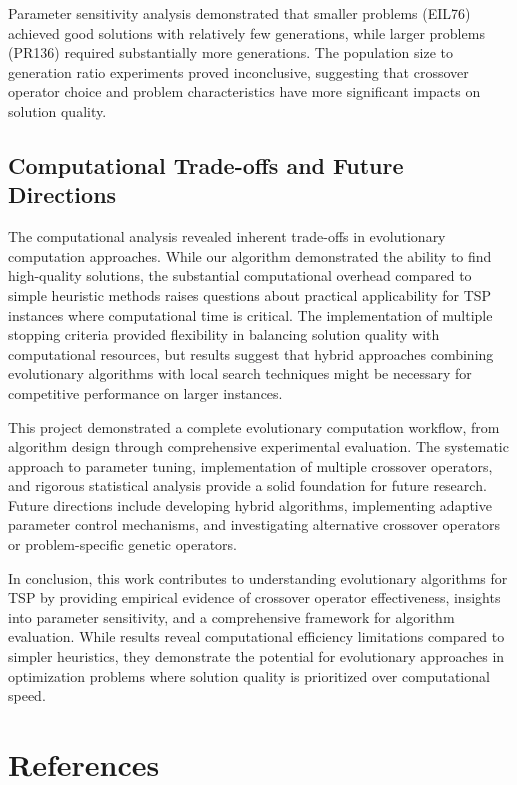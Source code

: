 \documentclass{scrartcl}
\begin{document}
Parameter sensitivity analysis demonstrated that smaller problems (EIL76) achieved good solutions with relatively few generations, while larger problems (PR136) required substantially more generations. The population size to generation ratio experiments proved inconclusive, suggesting that crossover operator choice and problem characteristics have more significant impacts on solution quality.

\subsection{Computational Trade-offs and Future Directions}

The computational analysis revealed inherent trade-offs in evolutionary computation approaches. While our algorithm demonstrated the ability to find high-quality solutions, the substantial computational overhead compared to simple heuristic methods raises questions about practical applicability for TSP instances where computational time is critical. The implementation of multiple stopping criteria provided flexibility in balancing solution quality with computational resources, but results suggest that hybrid approaches combining evolutionary algorithms with local search techniques might be necessary for competitive performance on larger instances.

This project demonstrated a complete evolutionary computation workflow, from algorithm design through comprehensive experimental evaluation. The systematic approach to parameter tuning, implementation of multiple crossover operators, and rigorous statistical analysis provide a solid foundation for future research. Future directions include developing hybrid algorithms, implementing adaptive parameter control mechanisms, and investigating alternative crossover operators or problem-specific genetic operators.

In conclusion, this work contributes to understanding evolutionary algorithms for TSP by providing empirical evidence of crossover operator effectiveness, insights into parameter sensitivity, and a comprehensive framework for algorithm evaluation. While results reveal computational efficiency limitations compared to simpler heuristics, they demonstrate the potential for evolutionary approaches in optimization problems where solution quality is prioritized over computational speed.

\section{References}
\end{document}
